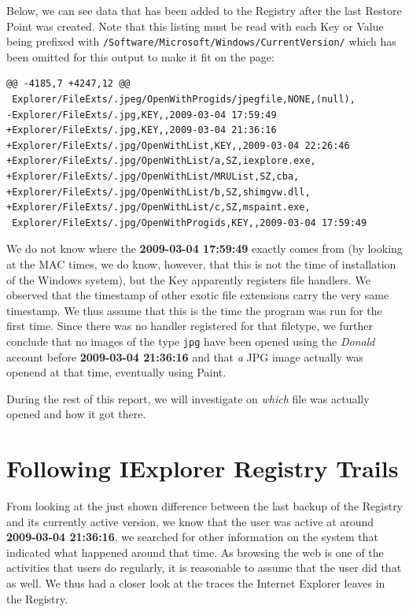 \documentclass[a4paper,
    11pt,
    normalheadings,
    parindent,
    UKenglish,
    abstracton,
    ]{scrartcl}
\begin{document}
Below, we can see data that has been added to the Registry after the last Restore Point was created.
Note that this listing must be read with each Key or Value being prefixed with \texttt{/Software/Microsoft/Windows/CurrentVersion/} which has been omitted for this output to make it fit on the page:
\begin{verbatim}
@@ -4185,7 +4247,12 @@
 Explorer/FileExts/.jpeg/OpenWithProgids/jpegfile,NONE,(null),
-Explorer/FileExts/.jpg,KEY,,2009-03-04 17:59:49
+Explorer/FileExts/.jpg,KEY,,2009-03-04 21:36:16
+Explorer/FileExts/.jpg/OpenWithList,KEY,,2009-03-04 22:26:46
+Explorer/FileExts/.jpg/OpenWithList/a,SZ,iexplore.exe,
+Explorer/FileExts/.jpg/OpenWithList/MRUList,SZ,cba,
+Explorer/FileExts/.jpg/OpenWithList/b,SZ,shimgvw.dll,
+Explorer/FileExts/.jpg/OpenWithList/c,SZ,mspaint.exe,
 Explorer/FileExts/.jpg/OpenWithProgids,KEY,,2009-03-04 17:59:49
\end{verbatim}

We do not know where the \textbf{2009-03-04 17:59:49} exactly comes from (by looking at the MAC times, we do know, however, that this is not the time of installation of the Windows system), but the Key apparently registers file handlers.
We observed that the timestamp of other exotic file extensions carry the very same timestamp.
We thus assume that this is the time the program was run for the first time.
Since there was no handler registered for that filetype, we further conclude that no images of the type \texttt{jpg} have been opened  using the \emph{Donald} account before \textbf{2009-03-04 21:36:16} and that \emph{a} JPG image actually was openend at that time, eventually using Paint.

During the rest of this report, we will investigate on \emph{which} file was actually opened and how it got there.




\section{Following IExplorer Registry Trails} \label{sec:iexplorer}
From looking at the just shown difference between the last backup of the Registry and its currently active version, we know that the user was active at around \textbf{2009-03-04 21:36:16}, we searched for other information on the system that indicated what happened around that time.
As browsing the web is one of the activities that users do regularly, it is reasonable to assume that the user did that as well.
We thus had a closer look at the traces the Internet Explorer leaves in the Registry.
\end{document}
